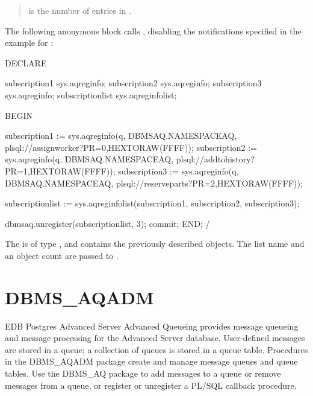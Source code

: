 \documentclass[letterpaper,10pt,english,openany,oneside]{sphinxmanual}
\begin{document}
\begin{quote}

 is the number of entries in .
\end{quote}


The following anonymous block calls , disabling the
notifications specified in the example for :

%
\begin{sphinxVerbatim}[commandchars=\\\{\}]
DECLARE

   subscription1 sys.aq\PYGZdl{}\PYGZus{}reg\PYGZus{}info;
   subscription2 sys.aq\PYGZdl{}\PYGZus{}reg\PYGZus{}info;
   subscription3 sys.aq\PYGZdl{}\PYGZus{}reg\PYGZus{}info;
   subscriptionlist sys.aq\PYGZdl{}\PYGZus{}reg\PYGZus{}info\PYGZus{}list;

BEGIN

   subscription1 := sys.aq\PYGZdl{}\PYGZus{}reg\PYGZus{}info(\PYGZsq{}q\PYGZsq{}, DBMS\PYGZus{}AQ.NAMESPACE\PYGZus{}AQ,
\PYGZsq{}plsql://assign\PYGZus{}worker?PR=0\PYGZsq{},HEXTORAW(\PYGZsq{}FFFF\PYGZsq{}));
   subscription2 := sys.aq\PYGZdl{}\PYGZus{}reg\PYGZus{}info(\PYGZsq{}q\PYGZsq{}, DBMS\PYGZus{}AQ.NAMESPACE\PYGZus{}AQ,
\PYGZsq{}plsql://add\PYGZus{}to\PYGZus{}history?PR=1\PYGZsq{},HEXTORAW(\PYGZsq{}FFFF\PYGZsq{}));
   subscription3 := sys.aq\PYGZdl{}\PYGZus{}reg\PYGZus{}info(\PYGZsq{}q\PYGZsq{}, DBMS\PYGZus{}AQ.NAMESPACE\PYGZus{}AQ,
\PYGZsq{}plsql://reserve\PYGZus{}parts?PR=2\PYGZsq{},HEXTORAW(\PYGZsq{}FFFF\PYGZsq{}));

   subscriptionlist := sys.aq\PYGZdl{}\PYGZus{}reg\PYGZus{}info\PYGZus{}list(subscription1,
 subscription2, subscription3);

   dbms\PYGZus{}aq.unregister(subscriptionlist, 3);
   commit;
  END;
   /
\end{sphinxVerbatim}

The  is of type , and contains
the previously described  objects. The list name and
an object count are passed to .

\newpage


\section{DBMS\_AQADM}
\label{\detokenize{dbms_aqadm::doc}}\label{\detokenize{dbms_aqadm:dbms-aqadm}}
EDB Postgres Advanced Server Advanced Queueing provides message queueing
and message processing for the Advanced Server database. User-defined
messages are stored in a queue; a collection of queues is stored in a
queue table. Procedures in the DBMS\_AQADM package create and manage
message queues and queue tables. Use the DBMS\_AQ package to add
messages to a queue or remove messages from a queue, or register or
unregister a PL/SQL callback procedure.
\end{document}
